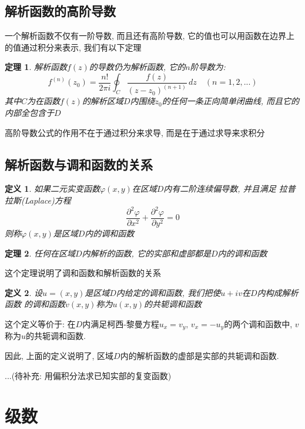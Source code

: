 \documentclass[12pt, a4paper, oneside]{ctexart}
\theoremstyle{plain}
\newtheorem{theorem}{定理}[section]
\newtheorem{definition}{定义}[section]
\theoremstyle{definition}
\theoremstyle{definition}
\begin{document}
\subsection{解析函数的高阶导数}
一个解析函数不仅有一阶导数, 而且还有高阶导数, 它的值也可以用函数在边界上的值通过积分来表示, 我们有以下定理
\begin{theorem}
    解析函数$f(z)$的导数仍为解析函数, 它的$n$阶导数为:
    \[
        f^{(n)}(z_0)=\frac{n!}{2\pi i}\oint_{C}\frac{f(z)}{(z-z_0)^{(n+1)}}\,dz \quad (n=1,2,...)
    \]
    其中$C$为在函数$f(z)$的解析区域$D$内围绕$z_0$的任何一条正向简单闭曲线, 而且它的内部全包含于$D$
\end{theorem}
高阶导数公式的作用不在于通过积分来求导, 而是在于通过求导来求积分

\subsection{解析函数与调和函数的关系}
\begin{definition}
    如果二元实变函数$\varphi(x,y)$在区域$D$内有二阶连续偏导数, 并且满足
    拉普拉斯(Laplace)方程
    \[
    \frac{\partial^2\varphi}{\partial x^2}+\frac{\partial^2\varphi}{\partial y^2}=0
    \]
    则称$\varphi(x,y)$是区域$D$内的调和函数
\end{definition}
\begin{theorem}
    任何在区域$D$内解析的函数, 它的实部和虚部都是$D$内的调和函数
\end{theorem}
这个定理说明了调和函数和解析函数的关系
\begin{definition}
    设$u=(x,y)$是区域$D$内给定的调和函数, 我们把使$u+iv$在$D$内构成解析函数
    的调和函数$v(x,y)$称为$u(x,y)$的共轭调和函数
\end{definition}
这个定义等价于: 在$D$内满足柯西-黎曼方程$u_x=v_y,\,v_x=-u_y$的两个调和函数中, 
$v$称为$u$的共轭调和函数.

因此, 上面的定义说明了, 区域$D$内的解析函数的虚部是实部的共轭调和函数.

...(待补充: 用偏积分法求已知实部的复变函数)

\section{级数}
\end{document}

